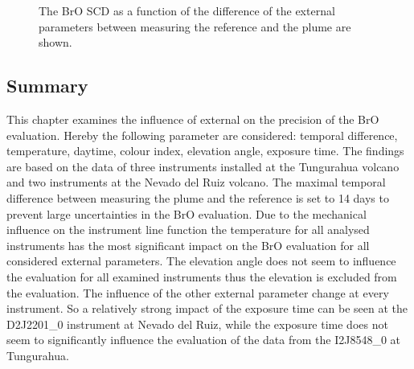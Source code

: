 \documentclass  [
  paper    = a4,
  BCOR     = 10mm,
  twoside,
  fontsize = 12pt,
  fleqn,
  toc      = bibnumbered,
  toc      = listofnumbered,
  numbers  = noendperiod,
  headings = normal,
  listof   = leveldown,
  version  = 3.03
]                                       {scrreprt}
\begin{document}
\begin{figure}
{}
\caption{The BrO SCD as a function of the difference of the external parameters between measuring the reference and the plume are shown.}
	\label{fig:difftempbroallinstruments}
\end{figure}
\FloatBarrier
	\subsection*{Summary}
This chapter examines the influence of external on the precision of the BrO evaluation. Hereby the following parameter are considered: 
temporal difference, temperature, daytime, colour index, elevation angle, exposure time.  The findings are based on the data of three instruments installed at the Tungurahua volcano and two instruments at the Nevado del Ruiz volcano. The maximal temporal difference between measuring the plume and the reference is set to 14 days to prevent large uncertainties in the BrO evaluation. Due to the mechanical influence on the instrument line function the temperature for all analysed instruments has the most significant impact on the BrO evaluation for all considered external parameters. The elevation angle does not seem to influence the evaluation for all examined instruments thus the elevation is excluded from the evaluation. The influence of the other external parameter change at every instrument. So a relatively strong impact of the exposure time can be seen at the D2J2201\_0 instrument at Nevado del Ruiz, while the exposure time does not seem to significantly influence the evaluation of the data from the  I2J8548\_0 at Tungurahua. 
	
\end{document}
